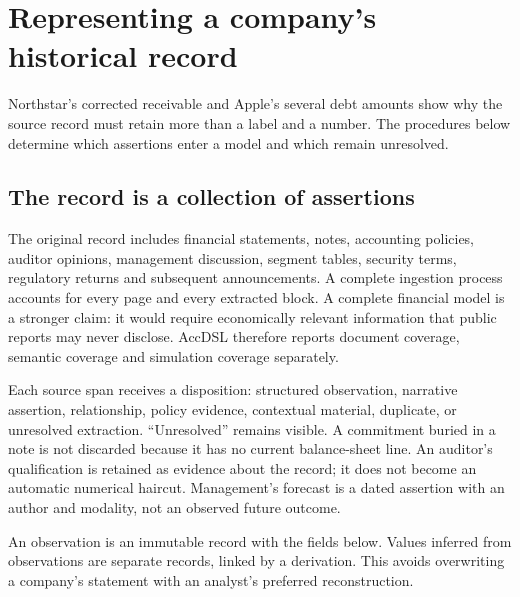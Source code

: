 \chapter{Representing a company's historical record}
\label{ch:history}

Northstar's corrected receivable and Apple's several debt amounts show why
the source record must retain more than a label and a number. The procedures
below determine which assertions enter a model and which remain unresolved.

\section{The record is a collection of assertions}

The original record includes financial statements, notes, accounting policies,
auditor opinions, management discussion, segment tables, security terms,
regulatory returns and subsequent announcements. A complete ingestion process
accounts for every page and every extracted block. A complete financial model
is a stronger claim: it would require economically relevant information that
public reports may never disclose. AccDSL therefore reports document coverage,
semantic coverage and simulation coverage separately.

Each source span receives a disposition: structured observation, narrative
assertion, relationship, policy evidence, contextual material, duplicate, or
unresolved extraction. ``Unresolved'' remains visible. A commitment buried in a
note is not discarded because it has no current balance-sheet line. An auditor's
qualification is retained as evidence about the record; it does not become an
automatic numerical haircut. Management's forecast is a dated assertion with
an author and modality, not an observed future outcome.

An observation is an immutable record with the fields below. Values inferred
from observations are separate records, linked by a derivation. This avoids
overwriting a company's statement with an analyst's preferred reconstruction.

